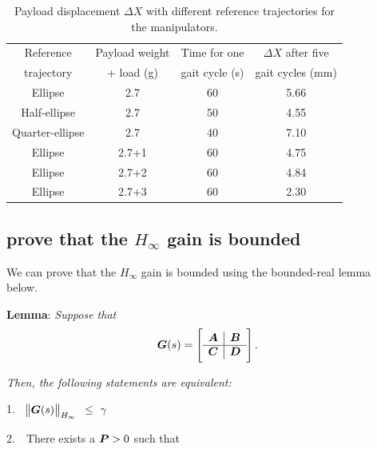 \begin{table}[t]
\centering
\caption{Payload displacement $\Delta X$ with different reference trajectories for the manipulators.}
\label{table:table_Payload displacement}
\begin{tabular}{c c c c}

\hline
Reference & Payload weight & Time for one & $\Delta X$ after five \\
trajectory & + load (g) & gait cycle (s) & gait cycles (mm)\\
\hline
Ellipse         & 2.7   & 60  & 5.66\\
Half-ellipse    & 2.7   & 50  & 4.55\\
Quarter-ellipse & 2.7   & 40  & 7.10\\
Ellipse         & 2.7+1 & 60  & 4.75\\
Ellipse         & 2.7+2 & 60  & 4.84\\
Ellipse         & 2.7+3 & 60  & 2.30\\
\hline
\end{tabular}
\end{table}

\subsection{prove that the ${H_{\infty}}$ gain is bounded}
We can prove that the ${H_{\infty}}$ gain is bounded using the bounded-real lemma~\cite{Boyd1994} below. 

\textbf{Lemma}: \textit{Suppose that}
\begin{equation*}
\boldsymbol{G}(s)=\begin{bmatrix}
\begin{array}{c | c}
\boldsymbol{A}  &  \boldsymbol{B} \\
\hline
\boldsymbol{C}  & \boldsymbol{D}
\end{array}  
\end{bmatrix}.
\end{equation*}

\textit{Then, the following statements are equivalent:} 

1.~~$\norm{\boldsymbol{G}(s)}_{H_{\infty}}$ $\leq$ $\gamma$ \vspace{1mm}
    
2.~~There exists a $\boldsymbol{P} > 0$ such that 

